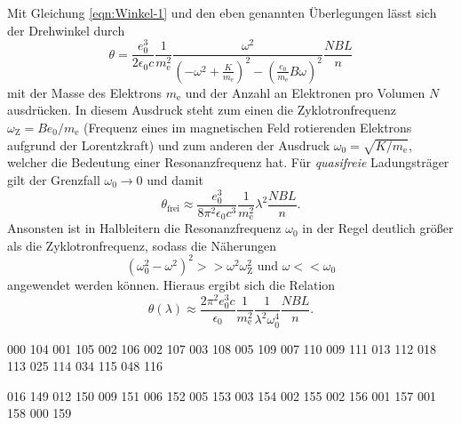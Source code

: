 Mit Gleichung \eqref{eqn:Winkel-1} und den eben genannten Überlegungen lässt
sich der Drehwinkel durch
\begin{equation*}
  \theta = \frac{e_0^3}{2 \epsilon_0 c}\frac{1}{m_\text{e}^2}
  \frac{\omega^2}{\left(-\omega^2 + \frac{K}{m_\text{e}}\right)^2 -
  \left(\frac{e_0}{m_\text{e}} B \omega\right)^2}
  \frac{N B L}{n}
\end{equation*}
mit der Masse des Elektrons $m_\text{e}$ und der Anzahl an Elektronen pro
Volumen $N$ ausdrücken.
In diesem Ausdruck steht zum einen die
Zyklotronfrequenz $\omega_\text{Z} = B e_0 / m_\text{e}$ (Frequenz eines im magnetischen
Feld rotierenden Elektrons aufgrund der Lorentzkraft) und zum anderen
der Ausdruck $\omega_0 = \sqrt{K / m_\text{e}}$,
welcher die Bedeutung einer Resonanzfrequenz hat.
Für \emph{quasifreie} Ladungsträger gilt der Grenzfall $\omega_0 \rightarrow 0$
und damit
\begin{equation}
  \theta_\text{frei} \approx \frac{e_0^3}{8 \pi^2 \epsilon_0 c^3}
  \frac{1}{m_\text{e}^2} \lambda^2 \frac{N B L}{n}.
  \label{eqn:theta-frei}
\end{equation}
Ansonsten ist in Halbleitern die Resonanzfrequenz $\omega_0$ in der Regel
deutlich größer als die Zyklotronfrequenz, sodass die Näherungen
\begin{equation*}
  \left(\omega_0^2 - \omega^2\right)^2 >> \omega^2 \omega_\text{Z}^2
  \text{    und    }
  \omega << \omega_0
\end{equation*}
angewendet werden können.
Hieraus ergibt sich die Relation
\begin{equation}
  \theta\left(\lambda\right) \approx \frac{2 \pi^2 e_0^3 c}{\epsilon_0}
  \frac{1}{m_\text{e}^2}\frac{1}{\lambda^2 \omega_0^4}
  \frac{N B L}{n}.
  \label{eqn:theta-gebunden}
\end{equation}

000 104
001 105
002 106
002 107
003 108
005 109
007 110
009 111
013 112
018 113
025 114
034 115
048 116


016 149
012 150
009 151
006 152
005 153
003 154
002 155
002 156
001 157
001 158
000 159